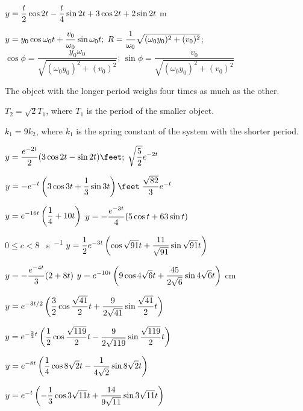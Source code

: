  $y=\displaystyle{\frac{t}{2}\cos2t-\frac{t}{4}\sin2t+3\cos2t+2\sin2t}$ m

$y=\displaystyle{y_0\cos\omega_0 t+\frac{v_0}{\omega_0}\sin\omega_0t;\;
R=\frac{1}{\omega_0} \sqrt{(\omega_0y_0)^2+(v_0)^2}}$;\;
$\cos\phi=\dfrac{y_0\omega_0}{\sqrt{(\omega_0y_0)^2+(v_0)^2}}$;\; $\sin\phi=\dfrac{v_0}{\sqrt{(\omega_0y_0)^2+(v_0)^2}}$

  The object with the longer period weighs four times as much as
the other.

  $T_2=\sqrt{2}T_1$, where $T_1$ is the period of the smaller
object.

  $k_1=9k_2$, where $k_1$ is the spring constant of the
system with the shorter period.



  $y=\dst{\frac{e^{-2t}}{2}(3\cos2t-\sin2t) \unit{\feet};
\;  \sqrt{\frac{5}{2}} e^{-2t}}$ \unit{\feet}

  $y=\dst{-e^{-t}\left(3\cos3t+\frac{1}{3}\sin
3t\right) \unit{\feet}\;  \frac{\sqrt{82}}{3}e^{-t}}$ \unit{\feet}



  $y=\displaystyle{e^{-16t}\left(\frac{1}{4}+10t\right)}$ \unit{\feet}
  $y=\displaystyle{-\frac{e^{-3t}}{4}(5\cos t+63\sin t)}$ \unit{\feet}

  $0\le c<8$ \unit{\pound\second\per\foot}
  $y=\displaystyle{\frac{1}{2}e^{-3t}\left(\cos\sqrt{91}t+\frac{11}{\sqrt{91}}\sin\sqrt{91}t\right)}$ \unit{\feet}

  $y=-\displaystyle{\frac{e^{-4t}}{3} (2+8t)}$ \unit{\feet}
  $y=\displaystyle{e^{-10t}\left(9\cos4\sqrt{6}t+\frac{45}{2\sqrt{6}}\sin4\sqrt{6} t\right)}$ \unit{\centi\meter}

  $\displaystyle{y=e^{-3t/2}\left(\frac{3}{2}\cos\frac{\sqrt{41}}{2}t
+\frac{9}{2\sqrt{41}}\sin\frac{\sqrt{41}}{2}t\right)}$ \unit{\feet}

  $y=\displaystyle{e^{-\frac{3}{2}t}\left(\frac{1}{2}\cos
\frac{\sqrt{119}}{2} t-\frac{9}{2\sqrt{119}}\sin\frac{\sqrt{119}}{2}t\right)}$ \unit{\feet}

  $\displaystyle{y=e^{-8t}\left(\frac{1}{4}\cos8\sqrt{2}t-\frac{1}{4\sqrt{2}}\sin8\sqrt{2}t\right)}$ \unit{\feet}

  $\displaystyle{y=e^{-t}\left(-\frac{1}{3}\cos3\sqrt{11} t+
\frac{14}{9\sqrt{11}}\sin3\sqrt{11}t\right)}$ \unit{\feet}


